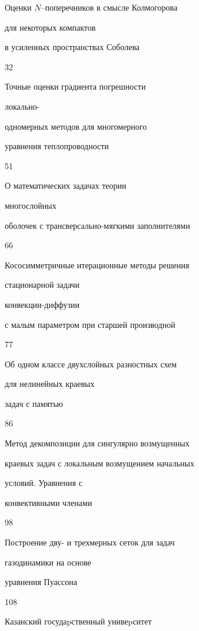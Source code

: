 

{Оценки $N$--поперечников в смысле Колмогорова


для некоторых компактов\newline


в усиленных пространствах Соболева}{32}







{Точные оценки градиента погрешности


локально-\newline


одномерных методов для многомерного


уравнения теплопроводности}{51}







{О математических задачах теории\newline


многослойных 


оболочек с трансверсально-мягкими заполнителями}{66}







{Кососимметричные итерационные методы решения 


стационарной задачи\newline


конвекции-диффузии 


с малым параметром при старшей производной}{77}







{Об одном классе двухслойных разностных схем 


для нелинейных краевых\newline


задач с памятью}{86}







{Метод декомпозиции для сингулярно возмущенных\newline


краевых задач с локальным возмущением начальных 


условий. Уравнения с\newline


конвективными членами}{98}







{Построение дву- и трехмерных сеток для задач 


газодинамики на основе\newline


уравнения Пуассона}{108}





\vfill


\noindent\raisebox{2pt}{\copyright} Казанский госудаpственный унивеpситет





